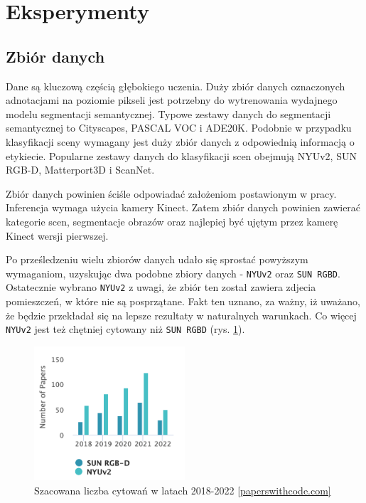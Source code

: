 \newpage %
\section{Eksperymenty}
\subsection{Zbiór  danych}
Dane są kluczową częścią głębokiego uczenia. Duży zbiór danych oznaczonych adnotacjami na poziomie pikseli jest potrzebny do wytrenowania wydajnego modelu segmentacji semantycznej. Typowe zestawy danych do segmentacji semantycznej to Cityscapes, PASCAL VOC i ADE20K. Podobnie w przypadku klasyfikacji sceny wymagany jest duży zbiór danych z odpowiednią informacją o etykiecie. Popularne zestawy danych do klasyfikacji scen obejmują  NYUv2, SUN RGB-D, Matterport3D i ScanNet.



Zbiór danych powinien ściśle odpowiadać założeniom postawionym w pracy. Inferencja wymaga użycia kamery Kinect. Zatem zbiór danych powinien zawierać kategorie scen, segmentacje obrazów oraz najlepiej być ujętym przez kamerę Kinect wersji pierwszej.

Po prześledzeniu wielu zbiorów danych udało się sprostać powyższym wymaganiom, uzyskując dwa podobne zbiory danych - \texttt{NYUv2} oraz \texttt{SUN RGBD}. Ostatecznie wybrano \texttt{NYUv2} z uwagi, że zbiór ten został zawiera zdjecia
pomieszczeń, w które nie są posprzątane. Fakt ten uznano, za ważny, iż uważano, że będzie przekładał się na lepsze rezultaty w naturalnych warunkach. Co więcej \texttt{NYUv2} jest też chętniej cytowany niż \texttt{SUN RGBD} (rys. \ref{fig:sun-vs-nyu}).

\begin{figure}[ht!]
    \centering
    \includegraphics[width=0.5\textwidth]{img/stats-dataset.png}
    \caption[]{Szacowana liczba cytowań w latach 2018-2022 \href{https://paperswithcode.com/dataset/sun-rgb-d}{[paperswithcode.com]}}
    \label{fig:sun-vs-nyu}
\end{figure}

